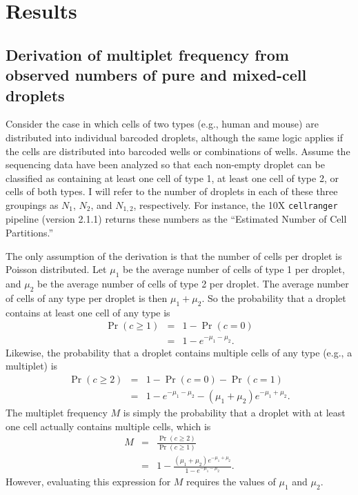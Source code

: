 \documentclass[fleqn,10pt,lineno]{wlpeerj} %
\begin{document}
\section*{Results}
\label{sec:results}

\subsection*{Derivation of multiplet frequency from observed numbers of pure and mixed-cell droplets}
Consider the case in which cells of two types (e.g., human and mouse) are distributed into individual barcoded droplets, although the same logic applies if the cells are distributed into barcoded wells or combinations of wells.
Assume the sequencing data have been analyzed so that each non-empty droplet can be classified as containing at least one cell of type 1, at least one cell of type 2, or cells of both types.
I will refer to the number of droplets in each of these three groupings as $N_1$, $N_2$, and $N_{1,2}$, respectively.
For instance, the 10X \texttt{cellranger} pipeline (version 2.1.1) returns these numbers as the ``Estimated Number of Cell Partitions.''

The only assumption of the derivation is that the number of cells per droplet is Poisson distributed.
Let $\mu_1$ be the average number of cells of type 1 per droplet, and $\mu_2$ be the average number of cells of type 2 per droplet.
The average number of cells of any type per droplet is then $\mu_1 + \mu_2$.
So the probability that a droplet contains at least one cell of any type is
\begin{eqnarray}
\label{eq:Pr1}
\Pr\left(c \ge 1\right) &=& 1 - \Pr\left(c = 0 \right) \nonumber \\
&=& 1 - e^{-\mu_1 - \mu_2}.
\end{eqnarray}
Likewise, the probability that a droplet contains multiple cells of any type (e.g., a multiplet) is
\begin{eqnarray}
\label{eq:Pr2}
\Pr\left(c \ge 2\right) &=& 1 - \Pr\left(c = 0\right) - \Pr\left(c = 1\right) \nonumber \\
&=& 1 - e^{-\mu_1 - \mu_2} - \left(\mu_1 + \mu_2\right) e^{-\mu_1 + \mu_2}.
\end{eqnarray}
The multiplet frequency $M$ is simply the probability that a droplet with at least one cell actually contains multiple cells, which is
\begin{eqnarray}
\label{eq:M}
M &=& \frac{\Pr\left(c \ge 2\right)}{\Pr\left(c \ge 1\right)} \nonumber \\
&=& 1 - \frac{\left(\mu_1 + \mu_2\right) e^{-\mu_1 + \mu_2}}{1 - e^{-\mu_1 - \mu_2}}.
\end{eqnarray}
However, evaluating this expression for $M$ requires the values of $\mu_1$ and $\mu_2$.
\end{document}
